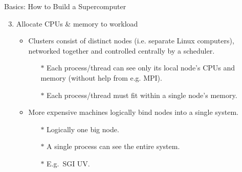 \begin{frame}{Basics: How to Build a Supercomputer}
\begin{enumerate}
\setcounter{enumi}{2}
\item{Allocate CPUs \& memory to workload}
\begin{itemize}
\item{Clusters consist of distinct nodes (i.e. separate Linux computers), networked together and controlled centrally by a \alert{scheduler}.}
  \begin{itemize}
\pause
\item[$\ast$]{\alert{Each process/thread can see only its local node's CPUs and memory (without help from e.g. MPI).}}
\pause
\item[$\ast$]{\color{red}Each process/thread must fit within a single node's memory.}
\end{itemize}
\pause
\item{More expensive machines logically bind nodes into a single system.}
\begin{itemize}
\item[$\ast$]{Logically one big node.}
\item[$\ast$]{A single process can see the entire system.}
\item[$\ast$]{E.g.\ SGI UV.}
\end{itemize}
\end{itemize}
\end{enumerate}
\end{frame}

